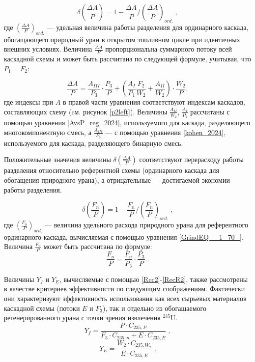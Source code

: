 \begin{equation} \label{DeltaA} 
    \delta(\frac{\Delta A}{P})=1-\frac{\Delta A}{P}/(\frac{\Delta A}{P})_{ord.} \; ,
\end{equation}
где $(\frac{\Delta A}{P})_{ord.}$ --- удельная величина работы разделения для ординарного каскада, обогащающего природный уран в открытом топливном цикле при идентичных внешних условиях. Величина $\frac{\Delta A}{P}$ пропорциональна суммарного потоку всей каскадной схемы и может быть рассчитана по следующей формуле, учитывая, что ${P_1}={F_2}$:

\begin{equation} \label{DeltaAP}
  \frac{\Delta A}{P} = \frac{A_{III}}{P_3} \cdot \frac{P_3}{P}+\left(\frac{A_I}{P_1} \frac{F_2}{W_2}+\frac{A_{II}}{W_2}\right) \cdot \frac{W_2}{P},
\end{equation}
где индексы при $A$ в правой части уравнения соответствуют индексам каскадов, составляющих схему (cм. рисунок \ref{p2left}). Величины $\frac{A_{II}}{W_2}$, $\frac{A_I}{P_1}$ рассчитаны с помощью уравнения \ref{AvsP_reg_2024}, используемого для каскада, разделяющего многокомпонентную смесь, а $\frac{A_{III}}{P_3}$ --- с помощью уравнения \ref{kohen_2024}, используемого для каскада, разделяющего бинарную смесь.

Положительные значения величины $\delta(\frac{\Delta A}{P})$ соответствуют перерасходу работы разделения относительно референтной схемы (ординарного каскада для обогащения природного урана), а отрицательные --- достигаемой экономии работы разделения.

\begin{equation} \label{DeltaFnu} 
    \delta(\frac{F_n}{P})=1-\frac{F_n}{P}/(\frac{F_n}{P})_{ord.} \; ,
\end{equation} 
где $(\frac{F_n}{P})_{ord.}$ --- величина удельного расхода природного урана для референтного ординарного каскада, вычисляемая с помощью уравнения \ref{GrindEQ__1_70_}. Величина $\frac{F_n}{P}$ может быть рассчитана по формуле:
\begin{equation} \label{Delta_Fnu}
    \frac{F_n}{P} = \frac{F_n}{P_3} \cdot \frac{P_3}{P} \; .
\end{equation}

Величины $Y_f$ и $Y_{E}$, вычисляемые с помощью \ref{Rec2}-\ref{RecR2}, также рассмотрены в качестве критериев эффективности по следующим соображениям. Фактически они характеризуют эффективность использования как всех сырьевых материалов каскадной схемы (потоки $E$ и $F_3$), так и отдельно из обогащаемого регенерированного урана с точки зрения извлечения $^{235}$U.
\begin{equation} \label{Rec2} 
    Y_f = \frac{P \cdot C_{235,P}}{F_3 \cdot C_{235,n} + E \cdot C_{235,E}} \; , 
\end{equation} 
\begin{equation} \label{RecR2} 
    Y_{E} = \frac{W_2\cdot C_{235,W_2}}{E \cdot C_{235,E}}  \; .    
\end{equation} 

